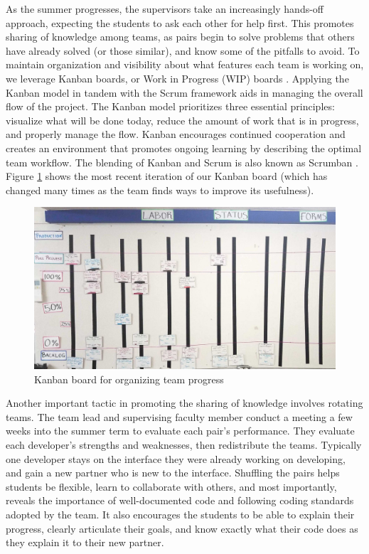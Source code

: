 As the summer progresses, the supervisors take an increasingly hands-off approach, expecting the students to ask each other for help first. This promotes sharing of knowledge among teams, as pairs begin to solve problems that others have already solved (or those similar), and know some of the pitfalls to avoid. To maintain organization and visibility about what features each team is working on, we leverage Kanban boards, or Work in Progress (WIP) boards \cite{anderson2010kanban}. Applying the Kanban model in tandem with the Scrum framework aids in managing the overall flow of the project. The Kanban model prioritizes three essential principles: visualize what will be done today, reduce the amount of work that is in progress, and properly manage the flow. Kanban encourages continued cooperation and creates an environment that promotes ongoing learning by describing the optimal team workflow. The blending of Kanban and Scrum is also known as Scrumban \cite{ladas2009scrumban}. Figure \ref{kanban} shows the most recent iteration of our Kanban board (which has changed many times as the team finds ways to improve its usefulness).
\begin{figure}[h]
 \centering
 \label{kanban}
 \includegraphics[width=\linewidth]{kanban.jpg}
 \caption{Kanban board for organizing team progress}
\end{figure}

Another important tactic in promoting the sharing of knowledge involves rotating teams. The team lead and supervising faculty member conduct a meeting a few weeks into the summer term to evaluate each pair's performance. They evaluate each developer's strengths and weaknesses, then redistribute the teams. Typically one developer stays on the interface they were already working on developing, and gain a new partner who is new to the interface. Shuffling the pairs helps students be flexible, learn to collaborate with others, and most importantly, reveals the importance of well-documented code and following coding standards adopted by the team. It also encourages the students to be able to explain their progress, clearly articulate their goals, and know exactly what their code does as they explain it to their new partner. 

